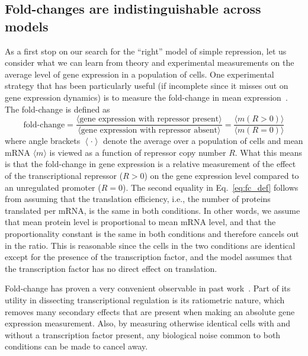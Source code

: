 \subsection{Fold-changes are indistinguishable across models}
As a first stop on our search for the ``right'' model of simple repression, let
us consider what we can learn from theory and experimental measurements on the
average level of gene expression in a population of cells. One experimental
strategy that has been particularly useful (if incomplete since it misses out on
gene expression dynamics) is to measure the fold-change in mean
expression~\cite{Garcia2011}. The fold-change is defined as
\begin{equation}
\text{fold-change}
= \frac{\langle \text{gene expression with repressor present} \rangle}
        {\langle \text{gene expression with repressor absent} \rangle}
= \frac{\langle m (R > 0) \rangle}{\langle m (R = 0) \rangle}
\label{eq:fc_def}
\end{equation}
where angle brackets $\left\langle \cdot \right\rangle$ denote the average over
a population of cells and mean mRNA $\langle m\rangle$ is viewed as a function
of repressor copy number $R$. What this means is that the fold-change in gene
expression is a relative measurement of the effect of the transcriptional
repressor ($R > 0$) on the gene expression level compared to an unregulated
promoter ($R = 0$). The second equality in Eq.~\ref{eq:fc_def} follows from
assuming that the translation efficiency, i.e., the number of proteins
translated per mRNA, is the same in both conditions. In other words, we assume
that mean protein level is proportional to mean mRNA level, and that the
proportionality constant is the same in both conditions and therefore cancels
out in the ratio. This is reasonable since the cells in the two conditions are
identical except for the presence of the transcription factor, and the model
assumes that the transcription factor has no direct effect on translation.

Fold-change has proven a very convenient observable in past
work~\cite{Garcia2011a, Brewster2014, Razo-Mejia2018, Chure2019}. Part of its
utility in dissecting transcriptional regulation is its ratiometric nature,
which removes many secondary effects that are present when making an absolute
gene expression measurement. Also, by measuring otherwise identical cells with
and without a transcription factor present, any biological noise common to both
conditions can be made to cancel away.

